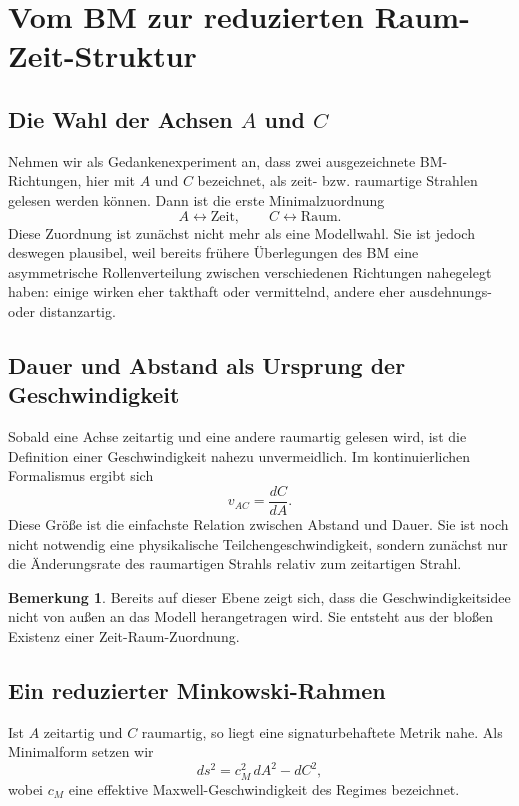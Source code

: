 \documentclass[11pt,a4paper]{article}
\theoremstyle{definition}
\newtheorem{bemerkung}[definition]{Bemerkung}
\theoremstyle{plain}
\begin{document}
	\section{Vom BM zur reduzierten Raum-Zeit-Struktur}
	
	\subsection{Die Wahl der Achsen $A$ und $C$}
	
	Nehmen wir als Gedankenexperiment an, dass zwei ausgezeichnete BM-Richtungen, hier mit $A$ und $C$ bezeichnet, als zeit- bzw. raumartige Strahlen gelesen werden können. Dann ist die erste Minimalzuordnung
	\[
	A \leftrightarrow \text{Zeit},
	\qquad
	C \leftrightarrow \text{Raum}.
	\]
	Diese Zuordnung ist zunächst nicht mehr als eine Modellwahl. Sie ist jedoch deswegen plausibel, weil bereits frühere Überlegungen des BM eine asymmetrische Rollenverteilung zwischen verschiedenen Richtungen nahegelegt haben: einige wirken eher takthaft oder vermittelnd, andere eher ausdehnungs- oder distanzartig.
	
	\subsection{Dauer und Abstand als Ursprung der Geschwindigkeit}
	
	Sobald eine Achse zeitartig und eine andere raumartig gelesen wird, ist die Definition einer Geschwindigkeit nahezu unvermeidlich. Im kontinuierlichen Formalismus ergibt sich
	\[
	v_{AC} = \frac{dC}{dA}.
	\]
	Diese Größe ist die einfachste Relation zwischen Abstand und Dauer. Sie ist noch nicht notwendig eine physikalische Teilchengeschwindigkeit, sondern zunächst nur die Änderungsrate des raumartigen Strahls relativ zum zeitartigen Strahl.
	
	\begin{bemerkung}
		Bereits auf dieser Ebene zeigt sich, dass die Geschwindigkeitsidee nicht von außen an das Modell herangetragen wird. Sie entsteht aus der bloßen Existenz einer Zeit-Raum-Zuordnung.
	\end{bemerkung}
	
	\subsection{Ein reduzierter Minkowski-Rahmen}
	
	Ist $A$ zeitartig und $C$ raumartig, so liegt eine signaturbehaftete Metrik nahe. Als Minimalform setzen wir
	\[
	ds^2 = c_M^2\, dA^2 - dC^2,
	\]
	wobei $c_M$ eine effektive Maxwell-Geschwindigkeit des Regimes bezeichnet.
	
\end{document}
